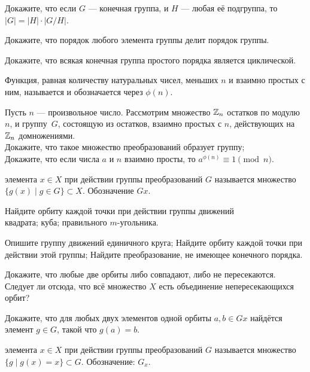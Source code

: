 \documentclass[a4paper,12pt]{article}
\begin{document}
Докажите, что если $G$ --- конечная группа, и $H$ --- любая её подгруппа, то $|G| = |H|\cdot|G/H|$.


  Докажите, что порядок любого элемента группы делит порядок группы.


  Докажите, что всякая конечная группа простого порядка является циклической.


Функция, равная количеству натуральных чисел, меньших $n$ и взаимно простых с ним, называется  и обозначается через $\phi(n)$.


Пусть $n$ --- произвольное число.
Рассмотрим множество $\mathbb{Z}_n$ остатков по модулю $n$, и группу~$G$, состоящую из остатков, взаимно простых с $n$, действующих на~$\mathbb{Z}_n$ домножениями.
\\ Докажите, что такое множество преобразований образует группу;
\\
Докажите, что если числа $a$ и $n$ взаимно просты, то $a^{\phi(n)} \equiv 1\pmod{n}$.


\newpage
{}


  элемента $x \in X$ при действии группы преобразований $G$ называется множество $\{g(x) \mid g \in G\} \subset X$.
 Обозначение $Gx$.

Найдите орбиту каждой точки при действии группы движений\\
квадрата;
куба;
правильного $m$-угольника.



Опишите группу движений единичного круга;
Найдите орбиту каждой точки при действии этой группы;
Найдите преобразование, не имеющее конечного порядка.

Докажите, что любые две орбиты либо совпадают, либо не пересекаются. Следует ли отсюда,
что всё множество $X$ есть объединение непересекающихся орбит?

Докажите, что для любых двух элементов одной орбиты $a,b \in Gx$ найдётся элемент $g \in G$,
такой что $g(a) = b$.


  элемента $x \in X$ при действии группы преобразований $G$ называется
множество $\{g \mid g(x)=x\} \subset G$.
 Обозначение: $G_x$.
\end{document}

